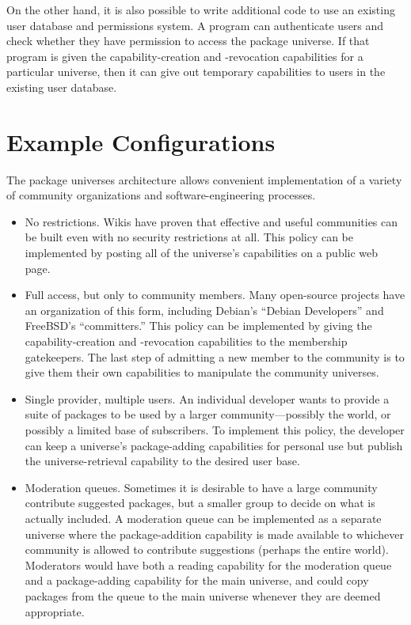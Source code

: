 \documentclass{IEEEtran}
\begin{document}
On the other hand, it is also possible to write additional code to use
an existing user database and permissions system.  A program can
authenticate users and check whether they have permission to access
the package universe.  If that program is given the
capability-creation and -revocation capabilities for a particular
universe, then it can give out temporary capabilities to users in the
existing user database.

  
\section{Example Configurations}
The package universes architecture allows convenient implementation of
a variety of community organizations and software-engineering
processes.
\begin{itemize}
\item No restrictions.  Wikis have proven that effective and useful
      communities can be built even with no security restrictions at
      all.  This policy can be implemented by posting all of the
      universe's capabilities on a public web page.

\item Full access, but only to community members.  Many open-source
      projects have an organization of this form, including Debian's
      ``Debian Developers'' and FreeBSD's ``committers.''  This policy
      can be implemented by giving the capability-creation and
      -revocation capabilities to the membership gatekeepers.
      The last step of admitting a new member to the community is to
      give them their own capabilities to manipulate the community
      universes.

\item Single provider, multiple users.  An individual developer wants
      to provide a suite of packages to be used by a larger
      community---possibly the world, or possibly a limited base of
      subscribers.  To implement this policy, the developer can keep a
      universe's package-adding capabilities for personal use but
      publish the universe-retrieval capability to the desired
      user base.

\item Moderation queues.  Sometimes it is desirable to have a large
      community contribute suggested packages, but a smaller group to
      decide on what is actually included.  A moderation queue can be
      implemented as a separate universe where the package-addition
      capability is made available to whichever community is allowed
      to contribute suggestions (perhaps the entire world).
      Moderators would have both a reading capability for the
      moderation queue and a package-adding capability for the main
      universe, and could copy packages from the queue to the main
      universe whenever they are deemed appropriate.



\end{itemize}
\end{document}
